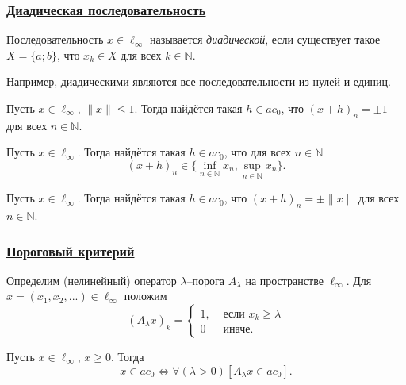 \begin{frame}\frametitle{\underline{Диадическая последовательность}}
	\begin{ddefinition}
		Последовательность $x\in\ell_\infty$
		называется \emph{диадической}, если существует такое $X=\{a;b\}$,
		что $x_k \in X$ для всех $k\in \mathbb N$.
	\end{ddefinition}

	Например, диадическими являются все последовательности из нулей и единиц.


	\begin{llemma}
		Пусть $x\in\ell_\infty$, $\|x\|\leq 1$.
		Тогда найдётся такая $h\in ac_0$, что $(x+h)_n = \pm 1$ для всех $n\in\mathbb N$.
	\end{llemma}

	\begin{ccorollary}
		Пусть $x\in\ell_\infty$.
		Тогда найдётся такая $h\in ac_0$, что для всех $n\in\mathbb N$
		\begin{equation*}
			(x+h)_n \in \{\inf_{n\in\mathbb N} x_n,\sup_{n\in\mathbb N} x_n\}
			.
		\end{equation*}
	\end{ccorollary}
	\vspace{-2em}
	\begin{ccorollary}
		Пусть $x\in\ell_\infty$.
		Тогда найдётся такая $h\in ac_0$, что $(x+h)_n =\pm \|x\|$ для всех $n\in\mathbb N$.
	\end{ccorollary}

	\vfill
\end{frame}





\begin{frame}\frametitle{\underline{Пороговый критерий}}
	\label{page:space_ac0}
	Определим (нелинейный) оператор $\lambda$--порога $A_\lambda$ на пространстве $\ell_\infty$.
	Для $x = (x_1, x_2, ...) \in \ell_\infty$ положим
	\begin{equation}
		(A_\lambda x)_k = \begin{cases}
			1, & \mbox{~если~} x_k \geq \lambda
			\\
			0  & \mbox{~иначе.~}
		\end{cases}
	\end{equation}

	\vfill

	\begin{ttheorem}
		Пусть $x\in\ell_\infty$, $x\geq 0$.
		Тогда
		\begin{equation}
			x\in ac_0 \Leftrightarrow
			\forall(\lambda>0)[A_\lambda x \in ac_0]
			.
		\end{equation}
	\end{ttheorem}
\end{frame}




